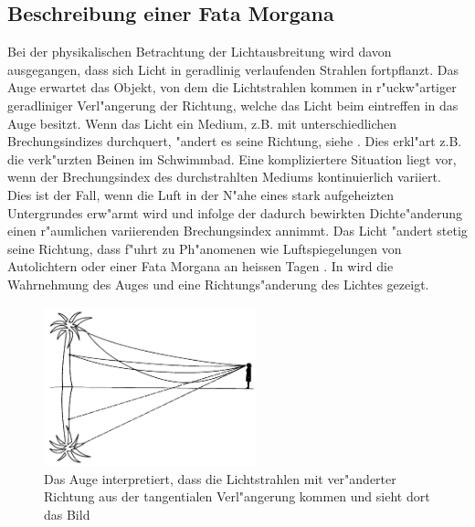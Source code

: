\subsection{Beschreibung einer Fata Morgana}
Bei der physikalischen Betrachtung der Lichtausbreitung wird davon
ausgegangen, dass sich Licht in
geradlinig verlaufenden Strahlen fortpflanzt. Das Auge erwartet das
Objekt, von dem die Lichtstrahlen
kommen in r"uckw"artiger geradliniger Verl"angerung der Richtung, welche
das Licht beim eintreffen in das Auge besitzt.
Wenn das Licht ein Medium, z.B. mit unterschiedlichen
Brechungsindizes durchquert, "andert es seine Richtung, siehe
. Dies erkl"art z.B. die verk"urzten Beinen im
Schwimmbad.
Eine kompliziertere Situation liegt vor, wenn der Brechungsindex des
durchstrahlten Mediums kontinuierlich variiert. 
Dies ist der Fall, wenn die Luft in der N"ahe eines stark aufgeheizten
Untergrundes erw"armt
wird und infolge der dadurch bewirkten Dichte"anderung einen r"aumlichen
variierenden Brechungsindex annimmt. 
Das Licht "andert stetig seine Richtung, dass f"uhrt zu Ph"anomenen wie
Luftspiegelungen von Autolichtern oder einer Fata Morgana an heissen
Tagen \cite{fataEinleitung}.
In  wird die Wahrnehmung des Auges und eine
Richtungs"anderung des Lichtes gezeigt.
\begin{figure}
\begin{center}
\includegraphics[width=0.55\textwidth]{licht/picture/FataEinleitung.png}
	\caption{Das Auge interpretiert, dass die Lichtstrahlen mit ver"anderter Richtung aus der tangentialen Verl"angerung kommen und sieht dort das Bild}
	\label{Ab:fataEinleitung}
\end{center}	
\end{figure}
